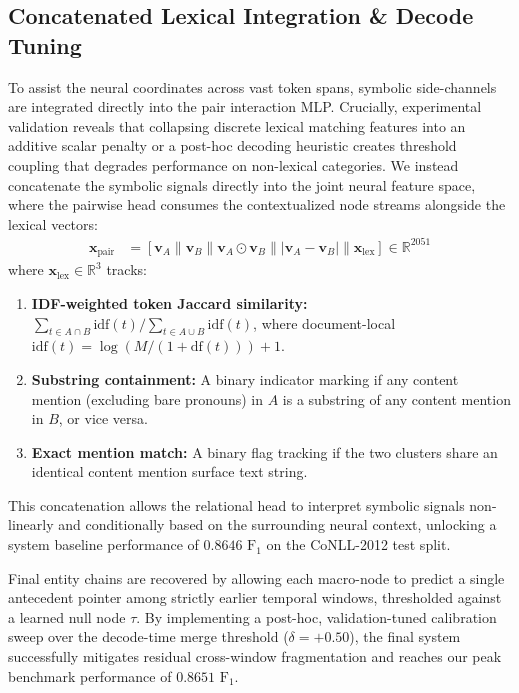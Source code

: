 \documentclass[12pt]{article}
\begin{document}
	\subsection{Concatenated Lexical Integration \& Decode Tuning}
	To assist the neural coordinates across vast token spans, symbolic side-channels are integrated directly into the pair interaction MLP. Crucially, experimental validation reveals that collapsing discrete lexical matching features into an additive scalar penalty or a post-hoc decoding heuristic creates threshold coupling that degrades performance on non-lexical categories. We instead concatenate the symbolic signals directly into the joint neural feature space, where the pairwise head consumes the contextualized node streams alongside the lexical vectors:
	\begin{align*}
		\mathbf{x}_{\text{pair}} &= \left[ \mathbf{v}_A \parallel \mathbf{v}_B \parallel \mathbf{v}_A \odot \mathbf{v}_B \parallel |\mathbf{v}_A - \mathbf{v}_B| \parallel \mathbf{x}_{\text{lex}} \right] \in \mathbb{R}^{2051}
	\end{align*}
	where $\mathbf{x}_{\text{lex}} \in \mathbb{R}^3$ tracks:
	\begin{enumerate}
		\item \textbf{IDF-weighted token Jaccard similarity:} $\sum_{t \in A \cap B} \text{idf}(t) / \sum_{t \in A \cup B} \text{idf}(t)$, where document-local $\text{idf}(t) = \log(M / (1 + \text{df}(t))) + 1$.
		\item \textbf{Substring containment:} A binary indicator marking if any content mention (excluding bare pronouns) in $A$ is a substring of any content mention in $B$, or vice versa.
		\item \textbf{Exact mention match:} A binary flag tracking if the two clusters share an identical content mention surface text string.
	\end{enumerate}
	This concatenation allows the relational head to interpret symbolic signals non-linearly and conditionally based on the surrounding neural context, unlocking a system baseline performance of $0.8646$ $\text{F}_1$ on the CoNLL-2012 test split.
	
	Final entity chains are recovered by allowing each macro-node to predict a single antecedent pointer among strictly earlier temporal windows, thresholded against a learned null node $\tau$. By implementing a post-hoc, validation-tuned calibration sweep over the decode-time merge threshold ($\delta = +0.50$), the final system successfully mitigates residual cross-window fragmentation and reaches our peak benchmark performance of $\mathbf{0.8651}$ $\text{F}_1$.
	
\end{document}
